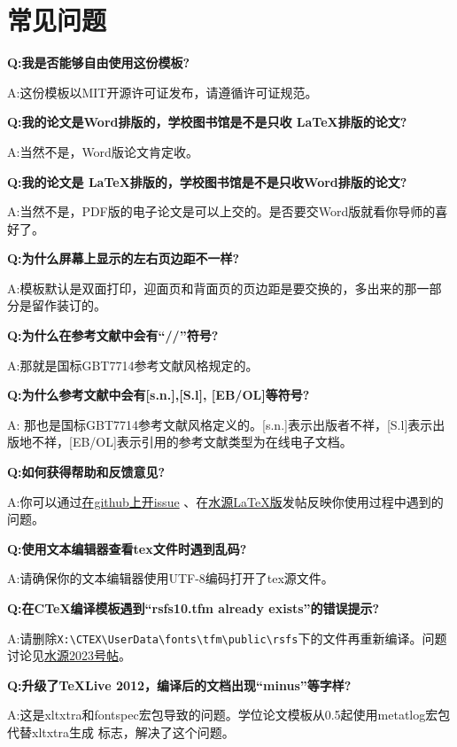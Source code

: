 \chapter{常见问题}
\label{chap:faq}

{\bfseries{}Q:我是否能够自由使用这份模板?}

A:这份模板以MIT开源许可证发布，请遵循许可证规范。

{\bfseries{}Q:我的论文是Word排版的，学校图书馆是不是只收 \LaTeX 排版的论文?}

A:当然不是，Word版论文肯定收。

{\bfseries{}Q:我的论文是 \LaTeX 排版的，学校图书馆是不是只收Word排版的论文?}

A:当然不是，PDF版的电子论文是可以上交的。是否要交Word版就看你导师的喜好了。

{\bfseries{}Q:为什么屏幕上显示的左右页边距不一样?}

A:模板默认是双面打印，迎面页和背面页的页边距是要交换的，多出来的那一部分是留作装订的。

{\bfseries{}Q:为什么在参考文献中会有“//”符号?}

A:那就是国标GBT7714参考文献风格规定的。

{\bfseries{}Q:为什么参考文献中会有[s.n.],[S.l], [EB/OL]等符号?}

A: 那也是国标GBT7714参考文献风格定义的。[s.n.]表示出版者不祥，[S.l]表示出版地不祥，[EB/OL]表示引用的参考文献类型为在线电子文档。

{\bfseries{}Q:如何获得帮助和反馈意见?}

A:你可以通过\href{https://github.com/weijianwen/sjtu-thesis-template-latex/issues}{在github上开issue}
、在\href{https://bbs.sjtu.edu.cn/bbsdoc?board=TeX_LaTeX}{水源LaTeX版}发帖反映你使用过程中遇到的问题。

{\bfseries{}Q:使用文本编辑器查看tex文件时遇到乱码?}

A:请确保你的文本编辑器使用UTF-8编码打开了tex源文件。

{\bfseries{}Q:在CTeX编译模板遇到“rsfs10.tfm already exists”的错误提示?}

A:请删除\verb+X:\CTEX\UserData\fonts\tfm\public\rsfs+下的文件再重新编译。问题讨论见\href{https://bbs.sjtu.edu.cn/bbstcon,board,TeX_LaTeX,reid,1352982719.html}{水源2023号帖}。

{\bfseries{}Q:升级了TeXLive 2012，编译后的文档出现“minus”等字样?}

A:这是xltxtra和fontspec宏包导致的问题。学位论文模板从0.5起使用metatlog宏包代替xltxtra生成 \XeTeX 标志，解决了这个问题。

